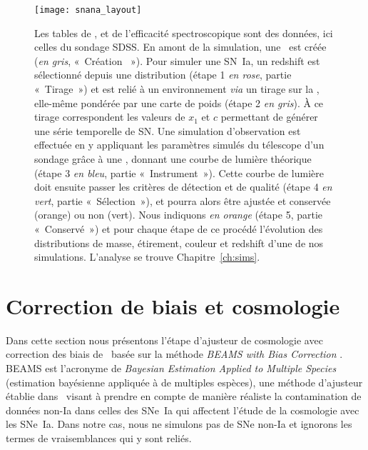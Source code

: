 \documentclass[../main/main.tex]{subfiles}
\begin{document}
\begin{figure}[p]
    \vspace*{-3.2cm}
    \centerfloat
    \texttt{[image: snana\_layout]}
    \caption[Schéma de fonctionnement d'une simulation avec
    \snana]{\footnotesize Les tables de \wgtmap, \simlib et de l'efficacité
        spectroscopique sont des données, ici celles du sondage SDSS. En amont
        de la simulation, une \hostlib\ est créée (\textit{en gris}, «~Création
        \hostlib~»). Pour simuler une SN~Ia, un redshift est sélectionné depuis
        une distribution (étape 1 \textit{en rose}, partie «~Tirage~») et est
        relié à un environnement \textit{via} un tirage sur la \hostlib,
        elle-même pondérée par une carte de poids (étape 2 \textit{en gris}). À
        ce tirage correspondent les valeurs de $x_1$ et $c$ permettant de
        générer une série temporelle de SN. Une simulation d'observation est
        effectuée en y appliquant les paramètres simulés du télescope d'un
        sondage grâce à une \simlib, donnant une courbe de lumière théorique
        (étape 3 \textit{en bleu}, partie «~Instrument~»). Cette courbe de
        lumière doit ensuite passer les critères de détection et de qualité
        (étape 4 \textit{en vert}, partie «~Sélection~»), et pourra alors être
        ajustée et conservée (orange) ou non (vert). Nous indiquons \textit{en
        orange} (étape 5, partie «~Conservé~») et pour chaque étape de ce
        procédé l'évolution des distributions de masse, étirement, couleur et
        redshift d'une de nos simulations. L'analyse se trouve
    Chapitre~\ref{ch:sims}.}\label{fig:snana_func}
\end{figure}

\section{Correction de biais et cosmologie}\label{sec:biais}

Dans cette section nous présentons l'étape d'ajusteur de cosmologie avec
correction des biais de \snana\ basée sur la méthode \textit{BEAMS with Bias
Correction} \citep[\bbc,][]{kessler2017}. BEAMS est l'acronyme de
\textit{Bayesian Estimation Applied to Multiple Species} (estimation bayésienne
appliquée à de multiples espèces), une méthode d'ajusteur établie
dans~\cite{kunz2007} visant à prendre en compte de manière réaliste la
contamination de données non-Ia dans celles des SNe~Ia qui affectent l'étude de
la cosmologie avec les SNe~Ia. Dans notre cas, nous ne simulons pas de SNe
non-Ia et ignorons les termes de vraisemblances qui y sont reliés.
\end{document}
